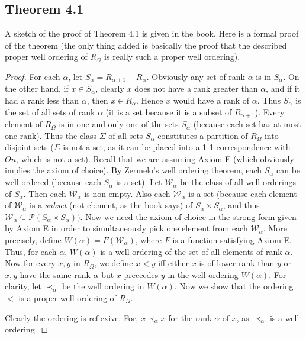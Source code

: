 \documentclass{article}
\theoremstyle{definition}
\begin{document}
\subsection*{Theorem 4.1}
A sketch of the proof of Theorem 4.1 is given in the book. Here is a formal proof of the theorem (the only thing added 
is basically the proof that the described proper well ordering of $R_\Omega$ is really such a proper well ordering).
\begin{proof}
For each $\alpha$, let $S_\alpha=R_{\alpha+1}-R_\alpha$. Obviously any set of rank $\alpha$ is in $S_\alpha$. On the 
other hand, if $x\in S_\alpha$, clearly $x$ does not have a rank greater than $\alpha$, and if it had a rank less than $\alpha$, then 
$x\in R_\alpha$. Hence $x$ would have a rank of $\alpha$. Thus $S_\alpha$ is the set of all sets of rank $\alpha$ (it is a set because it is a 
subset of $R_{\alpha+1}$). Every 
element of $R_\Omega$ is in one and only one of the sets $S_\alpha$ (because each set has at most one rank). Thus the class 
$\Sigma$ of all sets $S_\alpha$ constitutes a partition of $R_\Omega$ into disjoint sets ($\Sigma$ is not a set, as it can be 
placed into a 1-1 correspondence with $On$, which is not a set). Recall that we are assuming Axiom E (which obviously implies the 
axiom of choice). By Zermelo's well ordering theorem, each $S_\alpha$ can be well ordered (because each $S_\alpha$ is a set). 
Let $\mathcal{W}_\alpha$ be the class of all well orderings of $S_\alpha$. Then each $\mathcal{W}_\alpha$ is non-empty. Also each 
$\mathcal{W}_\alpha$ is a set (because each element of $\mathcal{W}_\alpha$ is a \textit{subset} (not element, as the book 
says) of $S_\alpha\times S_\alpha$, and thus $\mathcal{W}_\alpha\subseteq\mathcal{P}(S_\alpha\times S_\alpha))$. Now we need the axiom 
of choice in the strong form given by Axiom E in order to simultaneously pick one element from each $\mathcal{W}_\alpha$. More precisely, 
define $W(\alpha)=F(\mathcal{W}_\alpha)$, where $F$ is a function satisfying Axiom E. Thus, for each $\alpha$, $W(\alpha)$ is a well 
ordering of the set of all elements of rank $\alpha$.
	Now for every $x,y$ in $R_\Omega$, we define $x<y$ iff either $x$ is of lower rank than $y$ or $x,y$ have the same rank 
$\alpha$ but $x$ preceedes $y$ in the well ordering $W(\alpha)$. For clarity, let $\prec_\alpha$ be the well ordering in 
$W(\alpha)$. Now we show that the ordering $<$ is a proper well ordering of $R_\Omega$.

	Clearly the ordering is reflexive. For, $x\prec_\alpha x$ for the rank $\alpha$ of $x$, as $\prec_\alpha$ is a well ordering.


\end{proof}
\end{document}
